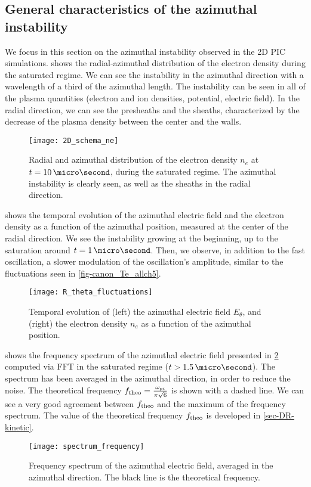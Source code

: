   \subsection{General characteristics of the azimuthal instability }
  We focus in this section on the azimuthal instability observed in the \ac{2D} \ac{PIC} simulations.
   shows the radial-azimuthal distribution of the electron density during the saturated regime.
  We can see the instability in the azimuthal direction with a wavelength of a third of the azimuthal length.
  The instability can be seen in all of the plasma quantities (electron and ion densities, potential, electric field).
  In the radial direction, we can see the presheaths and the sheaths, characterized by the decrease of the plasma density between the center and the walls.

  \begin{figure}[hbtp]
    \centering
    \texttt{[image: 2D\_schema\_ne]}
    \caption{Radial and azimuthal distribution of the electron density $n_e$ at $t=10\,\micro\second$, during the saturated regime. The azimuthal instability is clearly seen, as well as the sheaths in the radial direction. }
    \label{fig-2D_ne}
  \end{figure}
  
   shows the temporal evolution of the azimuthal electric field and the electron density as a function of the azimuthal position, measured at the center of the radial direction.
  We see the instability growing at the beginning, up to the saturation around $t=1\,\micro\second$.
  Then, we observe, in addition to the fast oscillation, a slower modulation of the oscillation's amplitude, similar to the fluctuations seen in \cref{fig-canon_Te_allch5}.
  \begin{figure}[!hbt]
    \centering
    \texttt{[image: R\_theta\_fluctuations]}
    \caption{Temporal evolution of (left) the azimuthal electric field $E_{\theta}$, and (right) the electron density $n_e$ as a function of the azimuthal position.}
    \label{fig-2DcutEx}
  \end{figure}

   shows the frequency spectrum of the azimuthal electric field presented in \cref{fig-2DcutEx} computed via \ac{FFT} in the saturated regime ($t > 1.5\,\micro\second$).
  The spectrum has been averaged in the azimuthal direction, in order to reduce the noise.
  The theoretical frequency $f_{\rm theo} = \frac{\omega_{pi}}{\pi \sqrt{6} }$ \citep{croes2018} is shown with a dashed line. 
  We can see a very good agreement between $f_{\rm theo}$ and the maximum of the frequency spectrum.
  The value of the theoretical frequency $f_{\rm theo}$ is developed in \cref{sec-DR-kinetic}.
  \begin{figure}[!hbt]
    \centering
    \texttt{[image: spectrum\_frequency]}
    \caption{Frequency spectrum of the azimuthal electric field, averaged in the azimuthal direction. The black line is the theoretical frequency.}
    \label{fig-FFT_ex}
  \end{figure}
  
